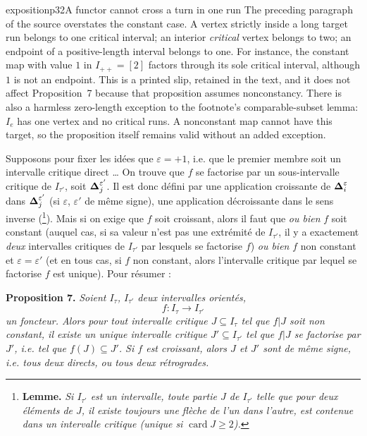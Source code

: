 \begin{dcomment}{exposition}{p32}{A functor cannot cross a turn in one run}
The preceding paragraph of the source overstates the constant case. A vertex strictly inside a long target run belongs to one critical interval; an interior \emph{critical} vertex belongs to two; an endpoint of a positive-length interval belongs to one. For instance, the constant map with value $1$ in $I_{++}=[2]$ factors through its sole critical interval, although $1$ is not an endpoint. This is a printed slip, retained in the text, and it does not affect Proposition~7 because that proposition assumes nonconstancy. There is also a harmless zero-length exception to the footnote's comparable-subset lemma: $I_e$ has one vertex and no critical runs. A nonconstant map cannot have this target, so the proposition itself remains valid without an added exception.
\end{dcomment}


Supposons pour fixer les idées que $\varepsilon=+1$, i.e. que le premier membre soit un intervalle critique direct \ldots{} On trouve que $f$ se factorise par un sous-intervalle critique de $I_{\tau'}$, soit $\boldsymbol{\Delta}^{\varepsilon'}_j$. Il est donc défini par une application croissante de $\boldsymbol{\Delta}^{\varepsilon}_i$ dans $\boldsymbol{\Delta}^{\varepsilon'}_j$ (si $\varepsilon$, $\varepsilon'$ de même signe), une application décroissante dans le sens inverse (\footnote[11]{\textbf{Lemme.} \textit{Si $I_{\tau'}$ est un intervalle, toute partie $J$ de $I_{\tau'}$ telle que pour deux éléments de $J$, il existe toujours une flèche de l'un dans l'autre, est contenue dans un intervalle critique (unique si} $\operatorname{card} J\geq 2$\textit{).}}). Mais si on exige que $f$ soit croissant, alors il faut que \textit{ou bien} $f$ soit constant (auquel cas, si sa valeur n'est pas une extrémité de $I_{\tau'}$, il y a exactement \textit{deux} intervalles critiques de $I_{\tau'}$ par lesquels se factorise $f$) \textit{ou bien} $f$ non constant et $\varepsilon=\varepsilon'$ (et en tous cas, si $f$ non constant, alors l'intervalle critique par lequel se factorise $f$ est unique). Pour résumer :

\textbf{Proposition 7.} \textit{Soient $I_\tau$, $I_{\tau'}$ deux intervalles orientés,}
\[
f : I_\tau\longrightarrow I_{\tau'}
\]
\textit{un foncteur. Alors pour tout intervalle critique $J\subseteq I_\tau$ tel que $f|J$ soit non constant, il existe un unique intervalle critique $J'\subseteq I_{\tau'}$ tel que $f|J$ se factorise par $J'$, i.e. tel que $f(J)\subseteq J'$. Si $f$ est croissant, alors $J$ et $J'$ sont de même signe,}
\textit{i.e. tous deux directs, ou tous deux rétrogrades.}


